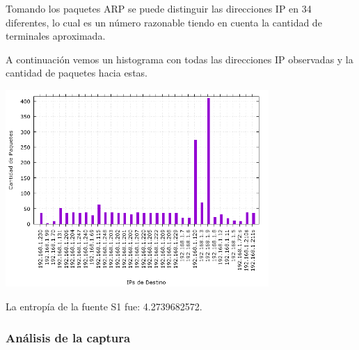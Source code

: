 Tomando los paquetes ARP se puede distinguir las direcciones IP en 34 diferentes, lo cual es un número razonable tiendo en cuenta la cantidad de terminales aproximada.

A continuación vemos un histograma con todas las direcciones IP observadas y la cantidad de paquetes hacia estas.

\begin{center}
\includegraphics[width=0.75\textwidth]{exp2-graficos/grafico2exp2.png}
\end{center}

La entrop\'ia de la fuente S1 fue: 4.2739682572.


\subsubsection{An\'alisis de la captura}
